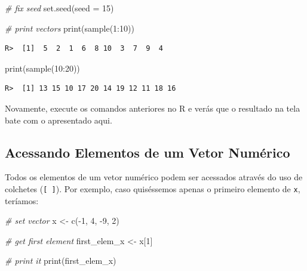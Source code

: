 \documentclass[
  11pt,
]{book}
\newenvironment{Shaded}{\begin{snugshade}}{\end{snugshade}}
\newcommand{\AttributeTok}[1]{\textcolor[rgb]{0.61,0.61,0.61}{#1}}
\newcommand{\CommentTok}[1]{\textcolor[rgb]{0.37,0.37,0.37}{\textit{#1}}}
\newcommand{\DecValTok}[1]{\textcolor[rgb]{0.06,0.06,0.06}{#1}}
\newcommand{\FunctionTok}[1]{\textcolor[rgb]{0,0,0}{#1}}
\newcommand{\NormalTok}[1]{#1}
\newcommand{\OtherTok}[1]{\textcolor[rgb]{0.37,0.37,0.37}{#1}}
\newcommand{\SpecialCharTok}[1]{\textcolor[rgb]{0,0,0}{#1}}
\begin{document}
\begin{Shaded}
\begin{Highlighting}[]
\CommentTok{\# fix seed}
\FunctionTok{set.seed}\NormalTok{(}\AttributeTok{seed =} \DecValTok{15}\NormalTok{)}

\CommentTok{\# print vectors}
\FunctionTok{print}\NormalTok{(}\FunctionTok{sample}\NormalTok{(}\DecValTok{1}\SpecialCharTok{:}\DecValTok{10}\NormalTok{))}
\end{Highlighting}
\end{Shaded}

\begin{verbatim}
R>  [1]  5  2  1  6  8 10  3  7  9  4
\end{verbatim}

\begin{Shaded}
\begin{Highlighting}[]
\FunctionTok{print}\NormalTok{(}\FunctionTok{sample}\NormalTok{(}\DecValTok{10}\SpecialCharTok{:}\DecValTok{20}\NormalTok{))}
\end{Highlighting}
\end{Shaded}

\begin{verbatim}
R>  [1] 13 15 10 17 20 14 19 12 11 18 16
\end{verbatim}

Novamente, execute os comandos anteriores no R e verás que o resultado na tela bate com o apresentado aqui.

\hypertarget{acessando-elementos-de-um-vetor-numuxe9rico}{%
\subsection{Acessando Elementos de um Vetor Numérico}\label{acessando-elementos-de-um-vetor-numuxe9rico}}

Todos os elementos de um vetor numérico podem ser acessados através do uso de colchetes (\texttt{{[}\ {]}}). Por exemplo, caso quiséssemos apenas o primeiro elemento de \texttt{x}, teríamos:

\begin{Shaded}
\begin{Highlighting}[]
\CommentTok{\# set vector}
\NormalTok{x }\OtherTok{\textless{}{-}} \FunctionTok{c}\NormalTok{(}\SpecialCharTok{{-}}\DecValTok{1}\NormalTok{, }\DecValTok{4}\NormalTok{, }\SpecialCharTok{{-}}\DecValTok{9}\NormalTok{, }\DecValTok{2}\NormalTok{)}

\CommentTok{\# get first element}
\NormalTok{first\_elem\_x }\OtherTok{\textless{}{-}}\NormalTok{ x[}\DecValTok{1}\NormalTok{]}

\CommentTok{\# print it}
\FunctionTok{print}\NormalTok{(first\_elem\_x)}
\end{Highlighting}
\end{Shaded}
\end{document}
